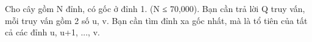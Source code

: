 Cho cây gồm N đỉnh, có gốc ở đỉnh 1. (N ≤ 70,000). Bạn cần trả lời Q truy vấn, mỗi truy vấn gồm 2 số u, v. Bạn cần tìm đỉnh xa gốc nhất, mà là tổ tiên của tất cả các đỉnh u, u+1, ..., v.